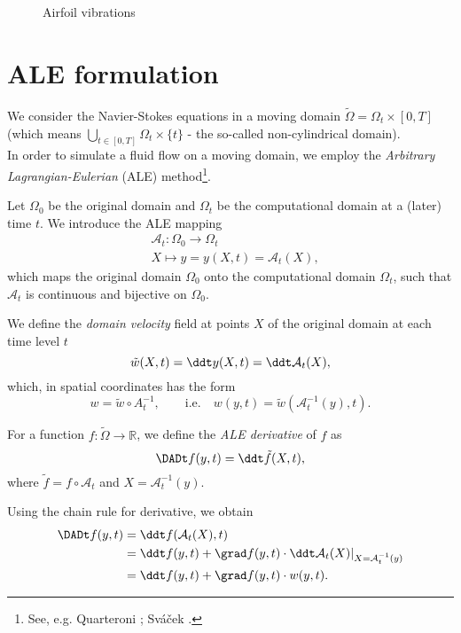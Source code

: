 \begin{figure}[t]
  \begin{center}
    \caption{Airfoil vibrations}
    \label{si-im-vibrations}
  \end{center}
\end{figure}


\section{ALE formulation}

We consider the Navier-Stokes equations in a moving domain $\widetilde\Omega=\Omega_t\times[0,T]$ (which 
means $\bigcup_{t\in[0,T]}\Omega_t\times\{t\}$ - the so-called non-cylindrical domain). \\
In order to simulate a fluid flow on a moving domain, we employ the 
{\it Arbitrary Lagrangian-Eulerian} (ALE) method\footnote{See, e.g. Quarteroni 
\cite[p. 37]{quarteroni}; Sváček \cite[p. 6]{svacek}.}. 

Let $\Omega_0$ be the original domain and $\Omega_t$ be the computational
domain at a (later) time $t$. We introduce the ALE mapping
\[
\begin{split}
&\mathcal A_t:\Omega_0\rightarrow\Omega_t\\
&X\mapsto y=y(X,t)=\mathcal A_t(X),
\end{split}
\]
which maps the original domain $\Omega_0$ onto the computational domain $\Omega_t$, such that 
$\mathcal A_t$ is continuous and bijective on $\Omega_0$. 

We define the {\it domain velocity} field at points $X$ of the original domain at each time level $t$
$$\tilde w(X,t)=\ddt y(X,t)=\ddt \mathcal A_t(X),$$
which, in spatial coordinates has the form
$$w=\tilde w\circ A_t^{-1}, \qquad \mbox{i.e.} \quad w(y,t)=\tilde w(\mathcal A_t^{-1}(y),t).$$

For a function $f:\widetilde\Omega\rightarrow\mathbb R$, we define the {\it ALE derivative} of $f$ as
$$\DADt f(y,t) = \ddt \tilde f(X,t),$$
where $\tilde f=f\circ\mathcal A_t$ and $X=\mathcal A_t^{-1}(y)$.

Using the chain rule for derivative, we obtain
\[
\begin{split}
\DADt f(y,t) &= \ddt f(\mathcal A_t(X),t) \\
&= \ddt f(y,t) + \grad f(y,t) \cdot \ddt \mathcal A_t(X)|_{X=\mathcal A_t^{-1}(y)} \\
&= \ddt f(y,t) + \grad f(y,t) \cdot w(y,t).
\end{split}
\]


